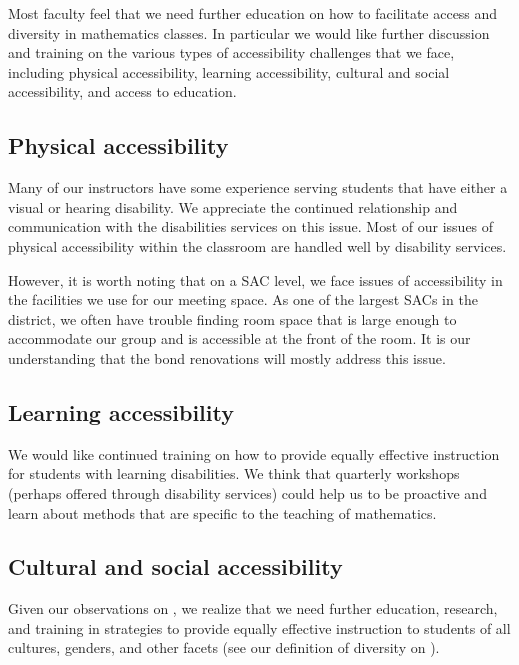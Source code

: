 Most faculty feel that we need further education on how to facilitate access
and diversity in mathematics classes. In particular we would like further
discussion and training on the various types of accessibility challenges that
we face, including physical accessibility, learning accessibility, cultural and
social accessibility, and access to education.

\subsection{Physical accessibility}
Many of our instructors have some experience serving students that have either
a visual or hearing disability. We appreciate the continued relationship and
communication with the disabilities services on this issue. Most of our issues
of physical accessibility within the classroom are handled well by disability
services.

However, it is worth noting that on a SAC level, we face issues of
accessibility in the facilities we use for our meeting space. As one of the
largest SACs in the district, we often have trouble finding room space that is
large enough to accommodate our group and is accessible at the front of the
room. It is our understanding that the bond renovations will mostly address
this issue.

\subsection{Learning accessibility}
We would like continued training on how to provide equally effective
instruction for students with learning disabilities. We think that quarterly
workshops (perhaps offered through disability services) could help us to be
proactive and learn about methods that are specific to the teaching of
mathematics.

\subsection{Cultural and social accessibility}
Given our observations on , we realize that we need
further education, research, and training in strategies to provide equally
effective instruction to students of all cultures, genders, and other facets
(see our definition of diversity on ).

